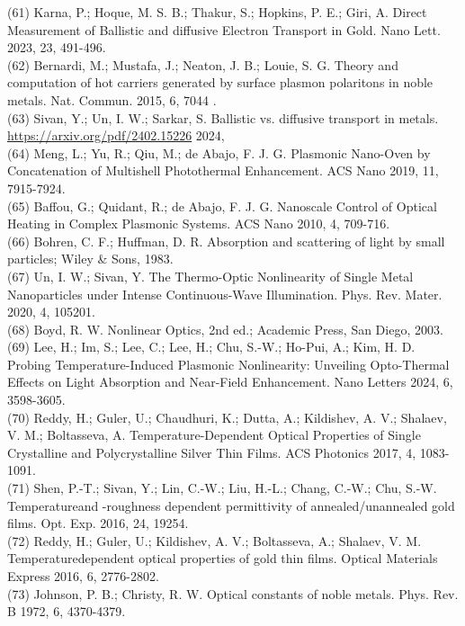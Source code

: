 \documentclass[10pt]{article}
\begin{document}
(61) Karna, P.; Hoque, M. S. B.; Thakur, S.; Hopkins, P. E.; Giri, A. Direct Measurement of Ballistic and diffusive Electron Transport in Gold. Nano Lett. 2023, 23, 491-496.\\
(62) Bernardi, M.; Mustafa, J.; Neaton, J. B.; Louie, S. G. Theory and computation of hot carriers generated by surface plasmon polaritons in noble metals. Nat. Commun. 2015, 6, 7044 .\\
(63) Sivan, Y.; Un, I. W.; Sarkar, S. Ballistic vs. diffusive transport in metals. \href{https://arxiv.org/pdf/2402.15226}{https://arxiv.org/pdf/2402.15226} 2024,\\
(64) Meng, L.; Yu, R.; Qiu, M.; de Abajo, F. J. G. Plasmonic Nano-Oven by Concatenation of Multishell Photothermal Enhancement. ACS Nano 2019, 11, 7915-7924.\\
(65) Baffou, G.; Quidant, R.; de Abajo, F. J. G. Nanoscale Control of Optical Heating in Complex Plasmonic Systems. ACS Nano 2010, 4, 709-716.\\
(66) Bohren, C. F.; Huffman, D. R. Absorption and scattering of light by small particles; Wiley \& Sons, 1983.\\
(67) Un, I. W.; Sivan, Y. The Thermo-Optic Nonlinearity of Single Metal Nanoparticles under Intense Continuous-Wave Illumination. Phys. Rev. Mater. 2020, 4, 105201.\\
(68) Boyd, R. W. Nonlinear Optics, 2nd ed.; Academic Press, San Diego, 2003.\\
(69) Lee, H.; Im, S.; Lee, C.; Lee, H.; Chu, S.-W.; Ho-Pui, A.; Kim, H. D. Probing Temperature-Induced Plasmonic Nonlinearity: Unveiling Opto-Thermal Effects on Light Absorption and Near-Field Enhancement. Nano Letters 2024, 6, 3598-3605.\\
(70) Reddy, H.; Guler, U.; Chaudhuri, K.; Dutta, A.; Kildishev, A. V.; Shalaev, V. M.; Boltasseva, A. Temperature-Dependent Optical Properties of Single Crystalline and Polycrystalline Silver Thin Films. ACS Photonics 2017, 4, 1083-1091.\\
(71) Shen, P.-T.; Sivan, Y.; Lin, C.-W.; Liu, H.-L.; Chang, C.-W.; Chu, S.-W. Temperatureand -roughness dependent permittivity of annealed/unannealed gold films. Opt. Exp. 2016, 24, 19254.\\
(72) Reddy, H.; Guler, U.; Kildishev, A. V.; Boltasseva, A.; Shalaev, V. M. Temperaturedependent optical properties of gold thin films. Optical Materials Express 2016, 6, 2776-2802.\\
(73) Johnson, P. B.; Christy, R. W. Optical constants of noble metals. Phys. Rev. B 1972, 6, 4370-4379.\\
\end{document}
